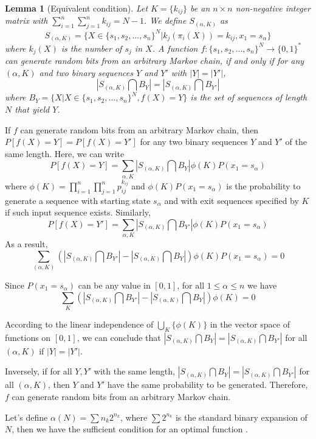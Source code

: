 \documentclass[journal]{IEEEtran}
\newtheorem{Lemma}[Theorem]{Lemma}
\begin{document}
\begin{Lemma}[Equivalent condition]\label{lemma_equ_condition}
Let $K=\{k_{ij}\}$ be an $n\times n$ non-negative integer matrix with $\sum_{i=1}^n\sum_{j=1}^n k_{ij}=N-1$. We define $S_{(\alpha,K)}$ as
$$S_{(\alpha,K)}=\{X\in\{s_1,s_2,...,s_n\}^N| k_j(\pi_i(X))=k_{ij}, x_1=s_{\alpha}\}$$
where $k_j(X)$ is the number of $s_j$ in $X$.
A function  $f:\{s_1,s_2,...,s_n\}^N \rightarrow \{0,1\}^*$ can generate random bits from an arbitrary Markov chain, if and only if for any $(\alpha,K)$ and two
binary sequences $Y$ and $Y'$ with $|Y|=|Y'|$,
$$|S_{(\alpha, K)}\bigcap B_Y|=|S_{(\alpha, K)}\bigcap B_{Y'}|$$
where $B_Y=\{X|X\in \{s_1,s_2,...,s_n\}^N, f(X)=Y\}$ is the set of sequences of length $N$ that yield $Y$.
\end{Lemma}

\proof If $f$ can generate random bits from an arbitrary Markov chain, then $P[f(X)=Y]=P[f(X)=Y']$ for any two binary sequences $Y$ and $Y'$ of the same length.
Here, we can write
$$P[f(X)=Y]=\sum_{\alpha, K}|S_{(\alpha,K)}\bigcap B_Y|\phi(K)P(x_1=s_\alpha)$$
where
$\phi(K)=\prod_{i=1}^n \prod_{j=1}^n p_{ij}^{k_{ij}}$
and $\phi(K)P(x_1=s_\alpha)$ is
the probability to generate a sequence with starting state $s_{\alpha}$ and with exit sequences specified by $K$ if such input sequence exists.
Similarly,
$$P[f(X)=Y']=\sum_{\alpha, K}|S_{(\alpha,K)}\bigcap B_{Y'}|\phi(K)P(x_1=s_\alpha)$$
As a result, $$\sum_{(\alpha,K)}(|S_{(\alpha,K)}\bigcap B_{Y'}|-|S_{(\alpha,K)}\bigcap B_Y|)\phi(K)P(x_1=s_\alpha)=0$$

Since $P(x_1=s_\alpha)$ can be any value in $[0,1]$, for all $1\leq \alpha \leq n$ we have
$$\sum_{K}(|S_{(\alpha,K)}\bigcap B_{Y'}|-|S_{(\alpha,K)}\bigcap B_Y|)\phi(K)=0$$

According to the linear independence of $\bigcup_{K}\{\phi(K)\}$ in the vector space of functions on $[0,1]$,
we can conclude that $|S_{(\alpha,K)}\bigcap B_Y|=|S_{(\alpha,K)}\bigcap B_{Y'}|$ for all $(\alpha,K)$ if $|Y|=|Y'|$.

Inversely, if for all $Y,Y'$ with the same length, $|S_{(\alpha,K)}\bigcap B_Y|=|S_{(\alpha,K)}\bigcap B_{Y'}|$ for all $(\alpha,K)$, then $Y$ and $Y'$ have the same probability to be generated.
Therefore, $f$ can generate random bits from an arbitrary Markov chain.
\hfill\QED

Let's define $\alpha(N)=\sum n_k 2^{n_k}$, where $\sum 2^{n_k}$ is the standard binary expansion of $N$, then we have the sufficient condition for an optimal function .
\end{document}
